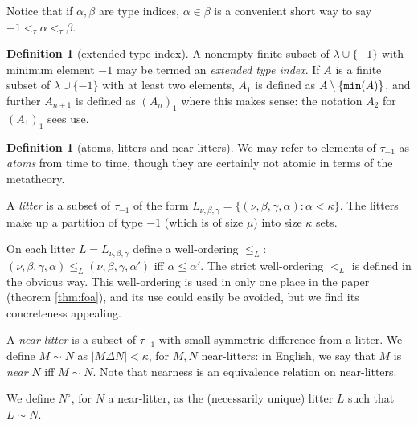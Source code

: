 \documentclass[112pt]{article}
\theoremstyle{definition}
\newtheorem{definition}[theorem]{Definition}
\theoremstyle{remark}
\begin{document}
Notice that if $\alpha,\beta$ are type indices, $\alpha\in \beta$ is a convenient short way to say $-1 <_\tau \alpha <_\tau \beta$.

\begin{definition}[extended type index]\label{def:extended_type_index}
A nonempty finite subset of $\lambda \cup \{-1\}$ {with minimum element $-1$} may be termed an {\em extended type index}.  If $A$ is a finite subset of $\lambda\cup \{-1\}$  with at least two elements, $A_1$ is defined as $A \setminus \{{\tt min}(A)\}$, and further $A_{n+1}$ is defined as $(A_n)_1$ where this makes sense:  the notation $A_2$ for $(A_1)_1$ sees use.
\end{definition}

\begin{definition}[atoms, litters and near-litters]\label{def:atom_litter_near_litter}
We may refer to elements of $\tau_{-1}$ as {\em atoms\/} from time to time, though they are certainly not atomic in terms of the metatheory.

A {\em litter\/} is a subset of $\tau_{-1}$ of the form $L_{\nu,\beta,\gamma} = \{(\nu,\beta,\gamma,\alpha):\alpha<\kappa\}$.  The litters make up a partition of type $-1$
(which is of size $\mu$) into size $\kappa$ sets.

On each litter $L =  L_{\nu,\beta,\gamma}$ define a well-ordering $\leq_L$:  $(\nu,\beta,\gamma,\alpha) \leq_L (\nu,\beta,\gamma,\alpha')$  iff $\alpha\leq \alpha'$.
The strict well-ordering $<_L$ is defined in the obvious way.  This well-ordering is used in only one place in the paper (theorem \ref{thm:foa}), and its use could easily be avoided, but we find its concreteness appealing.

A {\em near-litter\/} is a subset of $\tau_{-1}$ with small symmetric difference from a litter.  We define $M \sim N$ as $|M \Delta N|<\kappa$, for $M,N$ near-litters:  in English, we say that $M$ is {\em near\/} $N$ iff $M \sim N$.  Note that nearness is an equivalence relation on near-litters.

We define $N^\circ$, for $N$ a near-litter, as the (necessarily unique) litter $L$ such that $L \sim N$.
\end{definition}
\end{document}
